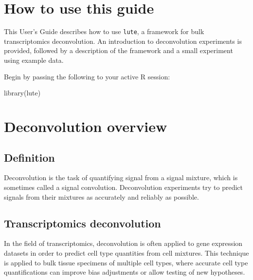 \documentclass[]{article}
\author{Sean K. Maden and Stephanie C. Hicks}
\date{17 October, 2023}
\newcommand{\hlstd}[1]{\textcolor[rgb]{0.251,0.251,0.251}{#1}}%
\newenvironment{Shaded}{\begin{myshaded}}{\end{myshaded}}
\newcommand{\FunctionTok}[1]{\hlstd{#1}}
\newcommand{\NormalTok}[1]{\hlstd{#1}}
\begin{document}
\maketitle


\hypertarget{how-to-use-this-guide}{%
\section{How to use this guide}\label{how-to-use-this-guide}}

This User's Guide describes how to use \texttt{lute}, a framework for bulk
transcriptomics deconvolution. An introduction to deconvolution experiments is
provided, followed by a description of the framework and a small experiment
using example data.

Begin by passing the following to your active R session:

\begin{Shaded}
\begin{Highlighting}[]
\FunctionTok{library}\NormalTok{(lute)}
\end{Highlighting}
\end{Shaded}

\hypertarget{deconvolution-overview}{%
\section{Deconvolution overview}\label{deconvolution-overview}}

\hypertarget{definition}{%
\subsection{Definition}\label{definition}}

Deconvolution is the task of quantifying signal from a signal mixture, which
is sometimes called a signal convolution. Deconvolution experiments try to
predict signals from their mixtures as accurately and reliably as possible.

\hypertarget{transcriptomics-deconvolution}{%
\subsection{Transcriptomics deconvolution}\label{transcriptomics-deconvolution}}

In the field of transcriptomics, deconvolution is often applied to gene
expression datasets in order to predict cell type quantities from cell mixtures.
This technique is applied to bulk tissue specimens of multiple cell types, where
accurate cell type quantifications can improve bias adjustments or allow testing
of new hypotheses.
\end{document}
